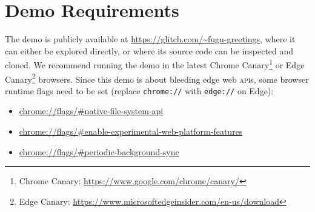 \documentclass[sigconf, anonymous]{acmart}
\begin{document}
\appendix

\section{Demo Requirements}

The demo is publicly available at \url{https://glitch.com/~fugu-greetings},
where it can either be explored directly,
or where its source code can be inspected and cloned.
We recommend running the demo in the latest Chrome
Canary\footnote{Chrome Canary: \url{https://www.google.com/chrome/canary/}}
or Edge
Canary\footnote{Edge Canary: \url{https://www.microsoftedgeinsider.com/en-us/download}}
browsers.
Since this demo is about bleeding edge web \textsc{api}s,
some browser runtime flags need to be set (replace \texttt{chrome://}
with \texttt{edge://} on Edge):

\begin{itemize}
  \item \url{chrome://flags/#native-file-system-api}
  \item \url{chrome://flags/#enable-experimental-web-platform-features}  
  \item \url{chrome://flags/#periodic-background-sync}
\end{itemize}
\end{document}

